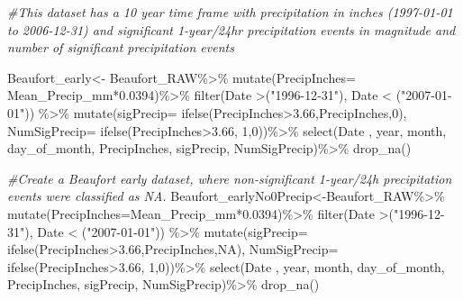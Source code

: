 \documentclass[
  12pt,
]{article}
\newenvironment{Shaded}{\begin{snugshade}}{\end{snugshade}}
\newcommand{\AttributeTok}[1]{\textcolor[rgb]{0.77,0.63,0.00}{#1}}
\newcommand{\CommentTok}[1]{\textcolor[rgb]{0.56,0.35,0.01}{\textit{#1}}}
\newcommand{\ConstantTok}[1]{\textcolor[rgb]{0.00,0.00,0.00}{#1}}
\newcommand{\DecValTok}[1]{\textcolor[rgb]{0.00,0.00,0.81}{#1}}
\newcommand{\FloatTok}[1]{\textcolor[rgb]{0.00,0.00,0.81}{#1}}
\newcommand{\FunctionTok}[1]{\textcolor[rgb]{0.00,0.00,0.00}{#1}}
\newcommand{\NormalTok}[1]{#1}
\newcommand{\OtherTok}[1]{\textcolor[rgb]{0.56,0.35,0.01}{#1}}
\newcommand{\SpecialCharTok}[1]{\textcolor[rgb]{0.00,0.00,0.00}{#1}}
\newcommand{\StringTok}[1]{\textcolor[rgb]{0.31,0.60,0.02}{#1}}
\begin{document}
\begin{Shaded}
\begin{Highlighting}[]
\CommentTok{\#This dataset has a 10 year time frame with precipitation in inches (1997{-}01{-}01 to 2006{-}12{-}31) and significant 1{-}year/24hr precipitation events in magnitude and number of significant precipitation events}

\NormalTok{Beaufort\_early}\OtherTok{\textless{}{-}}\NormalTok{ Beaufort\_RAW}\SpecialCharTok{\%\textgreater{}\%}
  \FunctionTok{mutate}\NormalTok{(}\AttributeTok{PrecipInches=}\NormalTok{ Mean\_Precip\_mm}\SpecialCharTok{*}\FloatTok{0.0394}\NormalTok{)}\SpecialCharTok{\%\textgreater{}\%}
  \FunctionTok{filter}\NormalTok{(Date }\SpecialCharTok{\textgreater{}}\NormalTok{(}\StringTok{"1996{-}12{-}31"}\NormalTok{), Date }\SpecialCharTok{\textless{}}\NormalTok{ (}\StringTok{"2007{-}01{-}01"}\NormalTok{)) }\SpecialCharTok{\%\textgreater{}\%} 
  \FunctionTok{mutate}\NormalTok{(}\AttributeTok{sigPrecip=} \FunctionTok{ifelse}\NormalTok{(PrecipInches}\SpecialCharTok{\textgreater{}}\FloatTok{3.66}\NormalTok{,PrecipInches,}\DecValTok{0}\NormalTok{),}
         \AttributeTok{NumSigPrecip=} \FunctionTok{ifelse}\NormalTok{(PrecipInches}\SpecialCharTok{\textgreater{}}\FloatTok{3.66}\NormalTok{, }\DecValTok{1}\NormalTok{,}\DecValTok{0}\NormalTok{))}\SpecialCharTok{\%\textgreater{}\%}
  \FunctionTok{select}\NormalTok{(Date , year, month, }
\NormalTok{         day\_of\_month, PrecipInches, sigPrecip, NumSigPrecip)}\SpecialCharTok{\%\textgreater{}\%}
  \FunctionTok{drop\_na}\NormalTok{()}
  
\CommentTok{\#Create a Beaufort early dataset, where non{-}significant 1{-}year/24h precipitation events were classified as NA.}
\NormalTok{Beaufort\_earlyNo0Precip}\OtherTok{\textless{}{-}}\NormalTok{Beaufort\_RAW}\SpecialCharTok{\%\textgreater{}\%}
  \FunctionTok{mutate}\NormalTok{(}\AttributeTok{PrecipInches=}\NormalTok{Mean\_Precip\_mm}\SpecialCharTok{*}\FloatTok{0.0394}\NormalTok{)}\SpecialCharTok{\%\textgreater{}\%}
  \FunctionTok{filter}\NormalTok{(Date }\SpecialCharTok{\textgreater{}}\NormalTok{(}\StringTok{"1996{-}12{-}31"}\NormalTok{), Date }\SpecialCharTok{\textless{}}\NormalTok{ (}\StringTok{"2007{-}01{-}01"}\NormalTok{)) }\SpecialCharTok{\%\textgreater{}\%} 
  \FunctionTok{mutate}\NormalTok{(}\AttributeTok{sigPrecip=} \FunctionTok{ifelse}\NormalTok{(PrecipInches}\SpecialCharTok{\textgreater{}}\FloatTok{3.66}\NormalTok{,PrecipInches,}\ConstantTok{NA}\NormalTok{),}
         \AttributeTok{NumSigPrecip=} \FunctionTok{ifelse}\NormalTok{(PrecipInches}\SpecialCharTok{\textgreater{}}\FloatTok{3.66}\NormalTok{, }\DecValTok{1}\NormalTok{,}\DecValTok{0}\NormalTok{))}\SpecialCharTok{\%\textgreater{}\%}
  \FunctionTok{select}\NormalTok{(Date , year, month, }
\NormalTok{         day\_of\_month, PrecipInches, sigPrecip, NumSigPrecip)}\SpecialCharTok{\%\textgreater{}\%}
  \FunctionTok{drop\_na}\NormalTok{()}


\end{Highlighting}
\end{Shaded}
\end{document}
